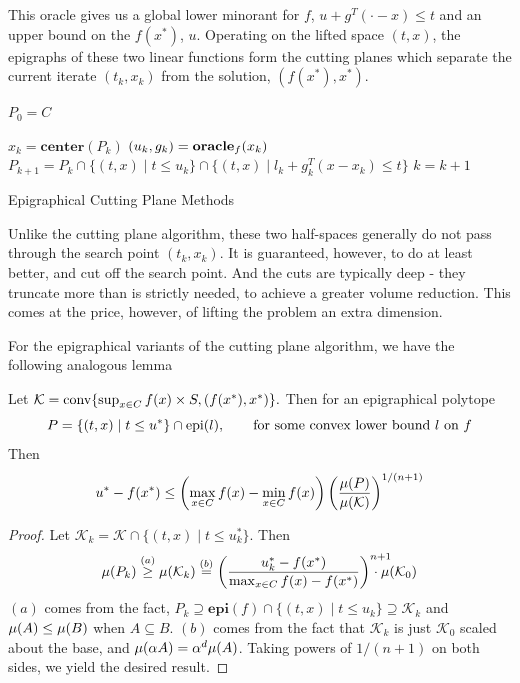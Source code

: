 This oracle gives us a global lower minorant for $f$, $u + g^T(\cdot - x) \leq t$ and an upper bound on the $f(x^*)$, $u$. Operating on the lifted space $(t,x)$, the epigraphs of these two linear functions form the cutting planes which separate the current iterate $(t_k, x_k)$ from the solution, $(f(x^*), x^*)$. 
\begin{algorithm} 
  \SetAlgoNoLine
  \DontPrintSemicolon
  $P_0 = C$\;
  
   {
  \nl $x_{k}  = \mathbf{center}(P_k)$\;
  \nl $(u_{k},g_{k})  = \mbox{\bf oracle}_f(x_{k})$\;
  \nl $P_{k+1}  =P_{k}\cap\{(t,x)\mid t\leq u_{k}\}\cap\{(t,x)\mid l_{k}+g_{k}^{T}(x-x_{k})\leq t\}$\;
  \nl $k = k + 1$
  }
  \caption{Epigraphical Cutting Plane Methods \label{alg:cutting_plane_epi}}
\end{algorithm}

Unlike the cutting plane algorithm, these two half-spaces generally do not
pass through the search point $(t_k, x_k)$. It is guaranteed, however, to do
at least better, and cut off the search point. And the cuts are typically deep - they truncate more than is strictly needed, to achieve a greater volume reduction. This comes at the price, however, of lifting the problem an extra dimension.

For the epigraphical variants of the cutting plane algorithm, we have the following analogous lemma

\begin{lem} \label{lem:non_strongly_convex_convergencegen}
Let  $\mathcal{K}=\mbox{{\rm conv}}\{\sup_{x\in C} f(x) \times  S,(f(x^*),x^*)\}.$
Then for an epigraphical polytope $$P =\{(t,x)\mid t\leq u^*\}\cap \mbox{\normalfont epi}(l), \qquad \mbox{for some convex lower bound $l$ on $f$}
$$
Then \[
u^*-f(x^*)\leq \left(\max_{x\in C}f(x)-\min_{x\in C}f(x) \right) \left( \frac{\mu(P)}{\mu(\mathcal{K})} \right)^{1/(n+1)}
\]
\end{lem}
\begin{proof}
Let $\mathcal{K}_k =\mathcal{K}\cap\{(t,x)\mid t \leq u^*_k\}$. Then 
\[
  \volmu(P_k)\overset{(a)}{\geq}\volmu(\mathcal{K}_k)\overset{(b)}{=}
  \left(\frac{u^*_k-f(x^*)}{\max_{x\in C} f(x) -f(x^*)}\right)^{n+1} \!\!\!\!\!\!\!\!\!\cdot \volmu(\mathcal{K}_0)
\]
$(a)$ comes from the fact, $P_k\supseteq \mathbf{epi}(f) \cap \{(t,x) \mid t \leq u_k\} \supseteq \mathcal{K}_k$ and
$\mu(A)\leq\mu(B)$ when $A\subseteq B$. $(b)$ comes from the fact
that $\mathcal{K}_k$ is just $\mathcal{K}_0$ scaled about the
base, and $\mu(\alpha A)=\alpha^{d}\mu(A)$.
Taking powers of $1/(n+1)$ on both sides, we yield the desired result.
\end{proof}

